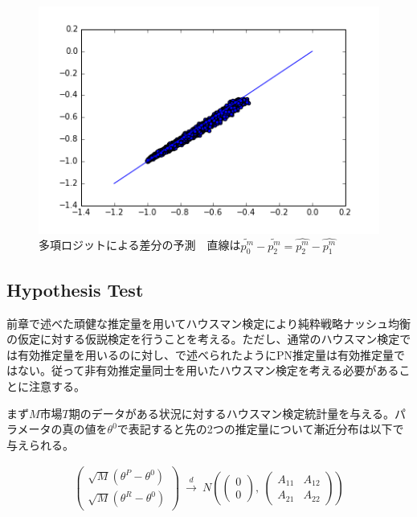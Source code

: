 \documentclass{jsarticle}
\begin{document}
\begin{figure}[h]
\centering
\includegraphics{logit.png}
\caption{多項ロジットによる差分の予測　直線は$\tilde{p_0^m} - \tilde{p_2^m} = \hat{p_2^m} - \hat{p_1^m}$}
\end{figure}

\subsection{Hypothesis Test}
前章で述べた頑健な推定量を用いてハウスマン検定により純粋戦略ナッシュ均衡の仮定に対する仮説検定を行うことを考える。ただし、通常のハウスマン検定では有効推定量を用いるのに対し、\cite{Tamer2003a}で述べられたようにPN推定量は有効推定量ではない。従って非有効推定量同士を用いたハウスマン検定を考える必要があることに注意する。

まず$M$市場$T$期のデータがある状況に対するハウスマン検定統計量を与える。パラメータの真の値を$\theta^0$で表記すると先の2つの推定量について漸近分布は以下で与えられる。

\begin{align*}
	\begin{pmatrix}
	\sqrt{M}(\theta^P - \theta^0)\\[8pt]
	\sqrt{M}(\theta^R - \theta^0)
	\end{pmatrix}\ \xrightarrow{d}\ 
	N\left( \begin{pmatrix}0\\[8pt]0
	\end{pmatrix},\ 
	\begin{pmatrix}
	A_{11} & A_{12}\\[8pt]
	A_{21} & A_{22}
	\end{pmatrix}
	\right)
\end{align*}
\end{document}
